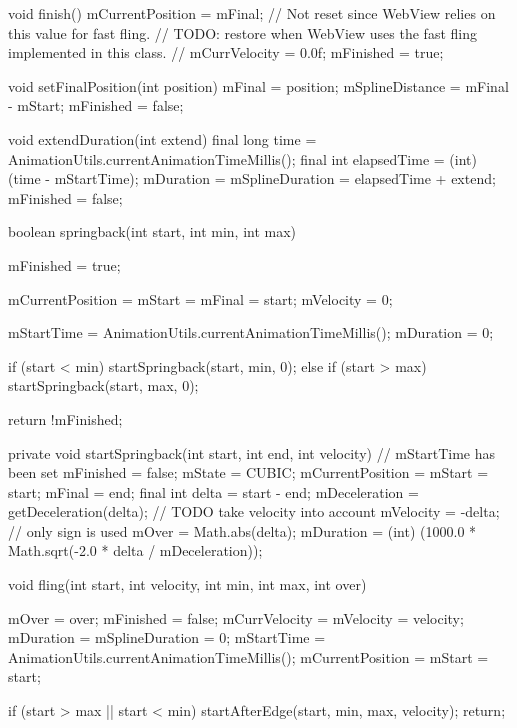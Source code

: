{{        void finish() {
            mCurrentPosition = mFinal;
            // Not reset since WebView relies on this value for fast fling.
            // TODO: restore when WebView uses the fast fling implemented in this class.
            // mCurrVelocity = 0.0f;
            mFinished = true;
        }

        void setFinalPosition(int position) {
            mFinal = position;
            mSplineDistance = mFinal - mStart;
            mFinished = false;
        }

        void extendDuration(int extend) {
            final long time = AnimationUtils.currentAnimationTimeMillis();
            final int elapsedTime = (int) (time - mStartTime);
            mDuration = mSplineDuration = elapsedTime + extend;
            mFinished = false;
        }

        boolean springback(int start, int min, int max) {
            mFinished = true;

            mCurrentPosition = mStart = mFinal = start;
            mVelocity = 0;

            mStartTime = AnimationUtils.currentAnimationTimeMillis();
            mDuration = 0;

            if (start < min) {
                startSpringback(start, min, 0);
            } else if (start > max) {
                startSpringback(start, max, 0);
            }

            return !mFinished;
        }

        private void startSpringback(int start, int end, int velocity) {
            // mStartTime has been set
            mFinished = false;
            mState = CUBIC;
            mCurrentPosition = mStart = start;
            mFinal = end;
            final int delta = start - end;
            mDeceleration = getDeceleration(delta);
            // TODO take velocity into account
            mVelocity = -delta; // only sign is used
            mOver = Math.abs(delta);
            mDuration = (int) (1000.0 * Math.sqrt(-2.0 * delta / mDeceleration));
        }

        void fling(int start, int velocity, int min, int max, int over) {
            mOver = over;
            mFinished = false;
            mCurrVelocity = mVelocity = velocity;
            mDuration = mSplineDuration = 0;
            mStartTime = AnimationUtils.currentAnimationTimeMillis();
            mCurrentPosition = mStart = start;

            if (start > max || start < min) {
                startAfterEdge(start, min, max, velocity);
                return;
            }

}}}
